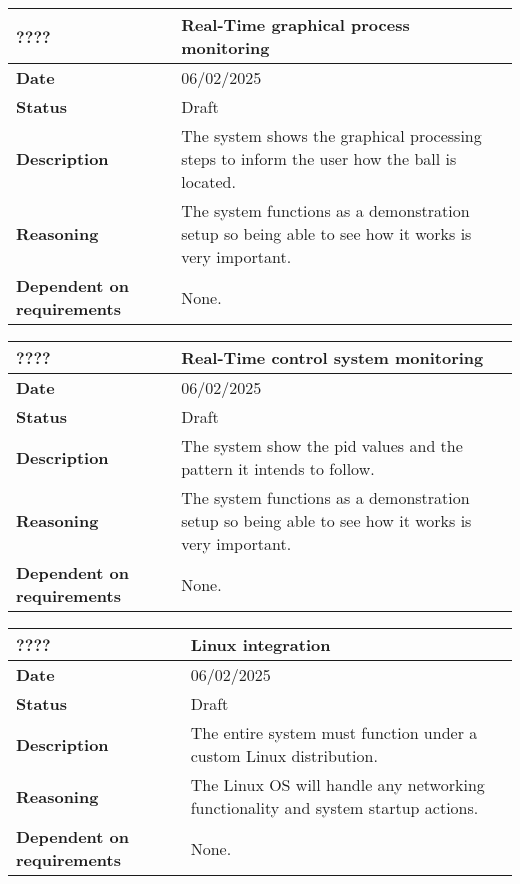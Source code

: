 \documentclass{article}
\begin{document}
\begin{table}[H]
    \renewcommand{\arraystretch}{1.3}
    \begin{tabular}{|l|p{10cm}|}
        \hline
        \rowcolor{gray!50}
        \textbf{????} & \textbf{Real-Time graphical process monitoring} \\ \hline
        \textbf{Date} & 06/02/2025 \\ \hline
        \textbf{Status} & Draft \\ \hline
        \textbf{Description} & The system shows the graphical processing steps to inform the user how the ball is located. \\ \hline
        \textbf{Reasoning} & The system functions as a demonstration setup so being able to see how it works is very important. \\ \hline
        \textbf{Dependent on requirements} & None. \\ \hline
    \end{tabular}
\end{table}

\begin{table}[H]
    \renewcommand{\arraystretch}{1.3}
    \begin{tabular}{|l|p{10cm}|}
        \hline
        \rowcolor{gray!50}
        \textbf{????} & \textbf{Real-Time control system monitoring} \\ \hline
        \textbf{Date} & 06/02/2025 \\ \hline
        \textbf{Status} & Draft \\ \hline
        \textbf{Description} & The system show the pid values and the pattern it intends to follow. \\ \hline
        \textbf{Reasoning} & The system functions as a demonstration setup so being able to see how it works is very important. \\ \hline
        \textbf{Dependent on requirements} & None. \\ \hline
    \end{tabular}
\end{table}

\begin{table}[H]
    \renewcommand{\arraystretch}{1.3}
    \begin{tabular}{|l|p{10cm}|}
        \hline
        \rowcolor{gray!50}
        \textbf{????} & \textbf{Linux integration} \\ \hline
        \textbf{Date} & 06/02/2025 \\ \hline
        \textbf{Status} & Draft \\ \hline
        \textbf{Description} & The entire system must function under a custom Linux distribution. \\ \hline
        \textbf{Reasoning} & The Linux OS will handle any networking functionality and system startup actions. \\ \hline
        \textbf{Dependent on requirements} & None. \\ \hline
    \end{tabular}
\end{table}
\end{document}
